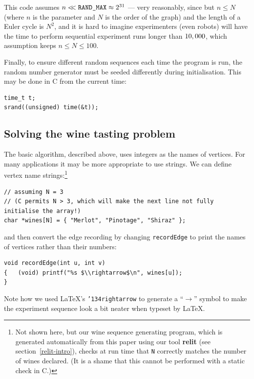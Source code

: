 \documentclass[preprint,times]{elsarticle}
\def\name#1{\textbf{#1}}
\begin{document}
This code assumes $n <\!\!<\mbox{\tt RAND\_MAX}\approx 2^{31}$   \cite[p119]{knuth2} --- very reasonably, since but $n \leq N$ (where $n$ is the parameter and $N$ is the order of the graph) and the length of a Euler cycle is $N^2$, and it is hard to imagine experimenters (even robots) will have the time to perform sequential experiment runs longer than $10,\kern 0.1pt 000$, which assumption keeps $n\leq N\leq100$. 

Finally, to ensure different random sequences each time the program is run, the random number generator must be seeded differently during initialisation. This may be done in C from the current time:

\begin{Verbatim}
time_t t;
srand((unsigned) time(&t)); 
\end{Verbatim}

\subsection{Solving the wine tasting problem}\label{winetasting}
The basic algorithm, described above, uses integers as the names of vertices. For many applications it may be more appropriate to use strings. We can define vertex name strings:\footnote{Not shown here, but our wine sequence generating program, which is generated automatically from this paper using our tool \name{relit} (see section~\ref{relit-intro}), checks at run time that \texttt{N} correctly matches the number of wines declared. (It is a shame that this cannot be performed with a static check in C.)}

\begin{Verbatim}
// assuming N = 3 
// (C permits N > 3, which will make the next line not fully initialise the array!)
char *wines[N] = { "Merlot", "Pinotage", "Shiraz" }; 
\end{Verbatim}

and then convert the edge recording by changing \texttt{recordEdge} to print the names of vertices rather than their numbers: 

\begin{Verbatim}
void recordEdge(int u, int v) 
{   (void) printf("%s $\\rightarrow$\n", wines[u]);
}
\end{Verbatim}

\label{winelist}
Note how we used \LaTeX's \texttt{\char'134rightarrow} to generate a ``$\rightarrow$'' symbol to make the experiment sequence look a bit neater when typeset by \LaTeX\@. 
\end{document}
